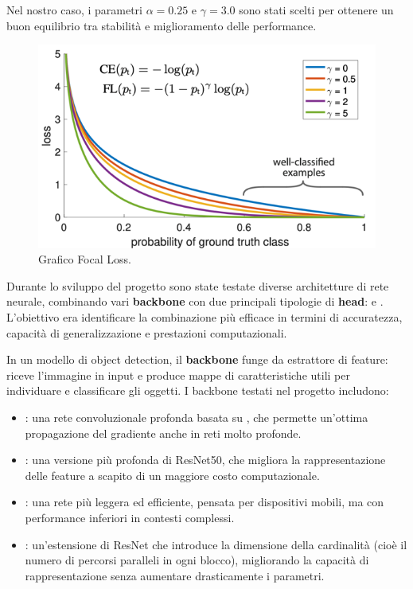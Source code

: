 \documentclass[minted, draw]{../tex/hebdomon}
\begin{document}
Nel nostro caso, i parametri \(\alpha = 0.25\) e \(\gamma = 3.0\) sono stati scelti per ottenere un buon equilibrio tra stabilità e miglioramento delle performance.




%
\begin{figure}[H]
	\centering
	\includegraphics[width=.6\linewidth]{figures/focal_loss.png}
	\caption{Grafico Focal Loss.}
	\label{fig:focal_loss}
\end{figure}
%


Durante lo sviluppo del progetto sono state testate diverse architetture di rete neurale, combinando vari \textbf{backbone} con due principali tipologie di \textbf{head}:  e . L’obiettivo era identificare la combinazione più efficace in termini di accuratezza, capacità di generalizzazione e prestazioni computazionali.

In un modello di object detection, il \textbf{backbone} funge da estrattore di feature: riceve l’immagine in input e produce mappe di caratteristiche utili per individuare e classificare gli oggetti. I backbone testati nel progetto includono:

\begin{itemize}
	\item {}: una rete convoluzionale profonda basata su , che permette un’ottima propagazione del gradiente anche in reti molto profonde.
	\item {}: una versione più profonda di ResNet50, che migliora la rappresentazione delle feature a scapito di un maggiore costo computazionale.
	\item {}: una rete più leggera ed efficiente, pensata per dispositivi mobili, ma con performance inferiori in contesti complessi. 
	\item {}: un’estensione di ResNet che introduce la dimensione della cardinalità (cioè il numero di percorsi paralleli in ogni blocco), migliorando la capacità di rappresentazione senza aumentare drasticamente i parametri.
\end{itemize}
\end{document}
